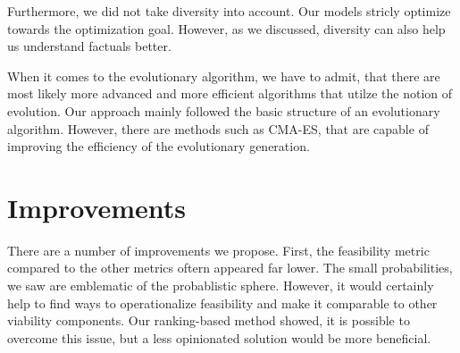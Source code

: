 \documentclass[12pt,a4paper]{report}
\begin{document}
Furthermore, we did not take diversity into account. Our models stricly optimize towards the optimization goal. However, as we discussed, diversity can also help us understand factuals better.

When it comes to the evolutionary algorithm, we have to admit, that there are most likely more advanced and more efficient algorithms that utilze the notion of evolution. Our approach mainly followed the basic structure of an evolutionary algorithm. However, there are methods such as CMA-ES, that are capable of improving the efficiency of the evolutionary generation. 


\section{Improvements}
There are a number of improvements we propose. First, the feasibility metric compared to the other metrics oftern appeared far lower. The small probabilities, we saw are emblematic of the probablistic sphere. However, it would certainly help to find ways to operationalize feasibility and make it comparable to other viability components. Our ranking-based method showed, it is possible to overcome this issue, but a less opinionated solution would be more beneficial. 
\end{document}
